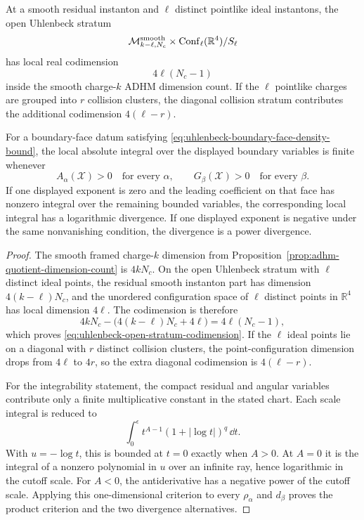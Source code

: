\begin{proposition}
\label{prop:uhlenbeck-face-integrability-budget}
At a smooth residual instanton and \(\ell\) distinct pointlike ideal
instantons, the open Uhlenbeck stratum
\[
  \mathcal M_{k-\ell,N_c}^{\rm smooth}
  \times
  \operatorname{Conf}_{\ell}(\mathbb R^4)/S_\ell
\]
has local real codimension
\begin{equation}
  4\ell(N_c-1)
  \label{eq:uhlenbeck-open-stratum-codimension}
\end{equation}
inside the smooth charge-\(k\) ADHM dimension count.  If the \(\ell\)
pointlike charges are grouped into \(r\) collision clusters, the diagonal
collision stratum contributes the additional codimension \(4(\ell-r)\).

For a boundary-face datum satisfying
\eqref{eq:uhlenbeck-boundary-face-density-bound}, the local absolute
integral over the displayed boundary variables is finite whenever
\begin{equation}
  A_\alpha(\mathcal X)>0
  \quad\text{for every }\alpha,
  \qquad
  G_\beta(\mathcal X)>0
  \quad\text{for every }\beta .
  \label{eq:uhlenbeck-face-integrability-conditions}
\end{equation}
If one displayed exponent is zero and the leading coefficient on that face
has nonzero integral over the remaining bounded variables, the corresponding
local integral has a logarithmic divergence.  If one displayed exponent is
negative under the same nonvanishing condition, the divergence is a power
divergence.
\end{proposition}

\begin{proof}
The smooth framed charge-\(k\) dimension from
Proposition~\ref{prop:adhm-quotient-dimension-count} is \(4kN_c\).  On the
open Uhlenbeck stratum with \(\ell\) distinct ideal points, the residual
smooth instanton part has dimension \(4(k-\ell)N_c\), and the unordered
configuration space of \(\ell\) distinct points in \(\mathbb R^4\) has local
dimension \(4\ell\).  The codimension is therefore
\[
  4kN_c-\bigl(4(k-\ell)N_c+4\ell\bigr)
  =
  4\ell(N_c-1),
\]
which proves \eqref{eq:uhlenbeck-open-stratum-codimension}.  If the
\(\ell\) ideal points lie on a diagonal with \(r\) distinct collision
clusters, the point-configuration dimension drops from \(4\ell\) to \(4r\),
so the extra diagonal codimension is \(4(\ell-r)\).

For the integrability statement, the compact residual and angular variables
contribute only a finite multiplicative constant in the stated chart.  Each
scale integral is reduced to
\[
  \int_0^\epsilon
  t^{A-1}(1+|\log t|)^q\,\dd t .
\]
With \(u=-\log t\), this is bounded at \(t=0\) exactly when \(A>0\).  At
\(A=0\) it is the integral of a nonzero polynomial in \(u\) over an infinite
ray, hence logarithmic in the cutoff scale.  For \(A<0\), the antiderivative
has a negative power of the cutoff scale.  Applying this one-dimensional
criterion to every \(\rho_\alpha\) and \(d_\beta\) proves the product
criterion and the two divergence alternatives.
\end{proof}


